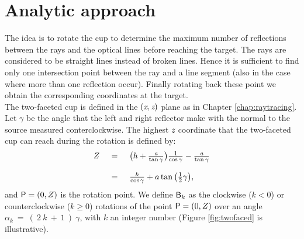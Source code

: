 \section{Analytic approach}
The idea is to rotate the cup to determine the maximum number of reflections between the rays and the optical lines before reaching the target. The rays are considered to be straight lines instead of broken lines. Hence it is sufficient to find only one intersection point between the ray and a line segment (also in the case where more than one reflection occur). Finally rotating back these point we obtain the corresponding coordinates at the target.\\ \indent
The two-faceted cup is defined in the $(\textit{x}, \textit{z})$ plane as in Chapter \ref{chap:raytracing}. 
Let $\gamma$ be the angle that the left and right reflector make with the normal to the source measured conterclockwise. 
The highest $\textit{z}$ coordinate that the two-faceted cup can reach during the rotation is defined by:
\begin{equation}\label{rotation}\begin{tabular}{llll}
$Z$ & $=$ & $ \big(h+\frac{\variabile{a}}{\tan\gamma}\big)\frac{1}{\cos\gamma}-\frac{\variabile{a}}{\tan\gamma}$ \\ $ \quad$ & $ \quad $ & $ \quad $ \\$ \quad$ &  $=$ & $\frac{h}{\cos\gamma}+a\tan\big(\frac{1}{2}\gamma\big),$\end{tabular}
\end{equation} and $\textsf{P}=(0,Z)$ is the rotation point. We define $\textsf{B}_k$ as the clockwise ($k<0$) or counterclockwise ($k\geq 0$) rotations of the point $\textsf{P}=(0,Z)$ over an angle $\alpha_k~=~(~2~k~+~1~)~\gamma$, with $k$ an integer number (Figure \ref{fig:twofaced} is illustrative).
